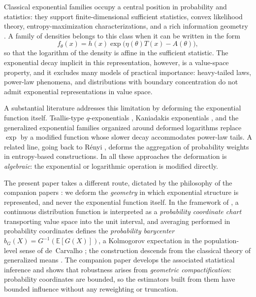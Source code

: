 \documentclass[11pt]{article}
\theoremstyle{definition}
\newcommand{\E}{\mathbb{E}}
\begin{document}
Classical exponential families occupy a central position in probability and
statistics: they support finite-dimensional sufficient statistics, convex
likelihood theory, entropy-maximization characterizations, and a rich
information geometry \cite{BarndorffNielsen1978,Brown1986,Amari2016}. A
family of densities belongs to this class when it can be written in the
form
\[
f_\theta(x)=h(x)\exp\bigl(\eta(\theta)T(x)-A(\theta)\bigr),
\]
so that the logarithm of the density is affine in the sufficient statistic.
The exponential decay implicit in this representation, however, is a
value-space property, and it excludes many models of practical importance:
heavy-tailed laws, power-law phenomena, and distributions with boundary
concentration do not admit exponential representations in value space.

A substantial literature addresses this limitation by deforming the
exponential function itself. Tsallis-type $q$-exponentials
\cite{Tsallis1988}, Kaniadakis exponentials \cite{Kaniadakis2002}, and the
generalized exponential families organized around deformed logarithms
\cite{Naudts2011} replace $\exp$ by a modified function whose slower decay
accommodates power-law tails. A related line, going back to R\'enyi
\cite{Renyi1961}, deforms the aggregation of probability weights in
entropy-based constructions. In all these approaches the deformation is
\emph{algebraic}: the exponential or logarithmic operation is modified
directly.

The present paper takes a different route, dictated by the philosophy of
the companion papers \cite{Cojocea2026a,Cojocea2026b}: we deform the
\emph{geometry} in which exponential structure is represented, and never
the exponential function itself. In the framework of \cite{Cojocea2026a}, a
continuous distribution function is interpreted as a \emph{probability
coordinate chart} transporting value space into the unit interval, and
averaging performed in probability coordinates defines the
\emph{probability barycenter} $b_G(X)=G^{-1}(\E[G(X)])$, a Kolmogorov
expectation in the population-level sense of de~Carvalho
\cite{deCarvalho2016}; the construction descends from the classical theory
of generalized means \cite{Kolmogorov1930,Nagumo1930,Aczel1966}. The
companion paper \cite{Cojocea2026b} develops the associated statistical
inference and shows that robustness arises from \emph{geometric
compactification}: probability coordinates are bounded, so the estimators
built from them have bounded influence without any reweighting or
truncation.
\end{document}
